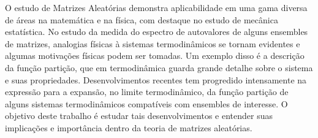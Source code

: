 O estudo de Matrizes Aleatórias demonstra aplicabilidade em uma gama diversa de áreas na matemática e na física, com destaque no estudo de mecânica estatística. No estudo da medida do espectro de autovalores de alguns ensembles de matrizes, analogias físicas à sistemas termodinâmicos se tornam evidentes e algumas motivações físicas podem ser tomadas. Um exemplo disso é a descrição da função partição, que em termodinâmica guarda grande detalhe sobre o sistema e suas propriedades. Desenvolvimentos recentes tem progredido intensamente na expressão para a expansão, no limite termodinâmico, da função partição de alguns sistemas termodinâmicos compatíveis com ensembles de interesse. O objetivo deste trabalho é estudar tais desenvolvimentos e entender suas implicações e importância dentro da teoria de matrizes aleatórias.